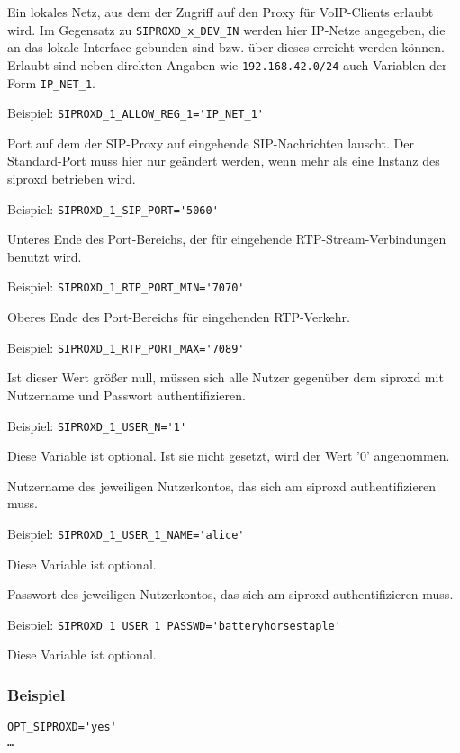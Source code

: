 \begin{description}

Ein lokales Netz, aus dem der Zugriff auf den Proxy für VoIP-Clients
erlaubt wird.  Im Gegensatz zu \verb+SIPROXD_x_DEV_IN+ werden hier
IP-Netze angegeben, die an das lokale Interface gebunden sind bzw. über
dieses erreicht werden können.  Erlaubt sind neben direkten Angaben wie
\verb+192.168.42.0/24+ auch Variablen der Form \verb+IP_NET_1+.

Beispiel: \verb+SIPROXD_1_ALLOW_REG_1='IP_NET_1'+


Port auf dem der SIP-Proxy auf eingehende SIP-Nachrichten lauscht.  Der
Standard-Port muss hier nur geändert werden, wenn mehr als eine Instanz
des siproxd betrieben wird.

Beispiel: \verb+SIPROXD_1_SIP_PORT='5060'+


Unteres Ende des Port-Bereichs, der für eingehende
RTP-Stream-Verbindungen benutzt wird.

Beispiel: \verb+SIPROXD_1_RTP_PORT_MIN='7070'+


Oberes Ende des Port-Bereichs für eingehenden RTP-Verkehr.

Beispiel: \verb+SIPROXD_1_RTP_PORT_MAX='7089'+


Ist dieser Wert größer null, müssen sich alle Nutzer gegenüber dem
siproxd mit Nutzername und Passwort authentifizieren.

Beispiel: \verb+SIPROXD_1_USER_N='1'+

Diese Variable ist optional. Ist sie nicht gesetzt, wird der Wert '0'
angenommen.


Nutzername des jeweiligen Nutzerkontos, das sich am siproxd
authentifizieren muss.

Beispiel: \verb+SIPROXD_1_USER_1_NAME='alice'+

Diese Variable ist optional.


Passwort des jeweiligen Nutzerkontos, das sich am siproxd
authentifizieren muss.

Beispiel: \verb+SIPROXD_1_USER_1_PASSWD='batteryhorsestaple'+

Diese Variable ist optional.

\end{description}

\subsubsection{Beispiel}

\begin{example}
\begin{verbatim}
OPT_SIPROXD='yes'
…
\end{verbatim}
\end{example}
